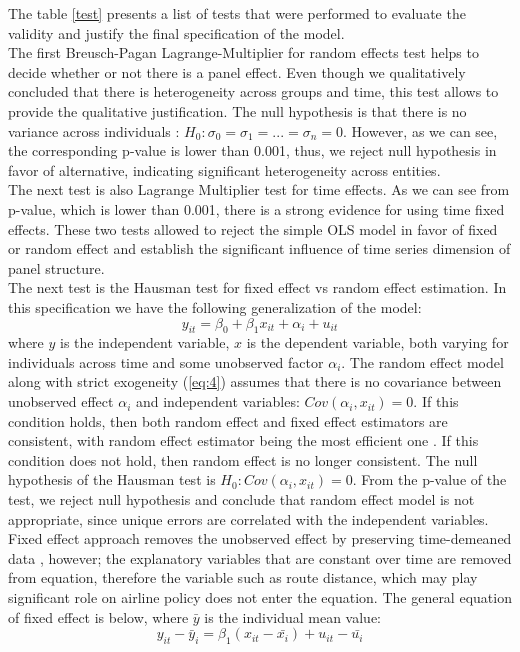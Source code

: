 \documentclass[titlepage, 11pt]{article}
\begin{document}
The table \ref{test} presents a list of tests that were performed to evaluate the validity and justify the final specification of the model. \\ 
\tab The first Breusch-Pagan Lagrange-Multiplier for random effects test helps to decide whether or not there is a panel effect. Even though we qualitatively concluded that there is heterogeneity across groups and time, this test allows to provide the qualitative justification. The null hypothesis is that there is no variance across individuals \cite{book}:
$H_0: \sigma_0=\sigma_1=...=\sigma_n=0$. However, as we can see, the corresponding p-value is lower than 0.001, thus, we reject null hypothesis in favor of alternative, indicating significant heterogeneity across entities.  \\ 
\tab The next test is also Lagrange Multiplier test for time effects. As we can see from p-value, which is lower than 0.001, there is a strong evidence for using time fixed effects. These two tests allowed to reject the simple OLS model in favor of fixed or random effect and establish the significant influence of time series dimension of panel structure.    \\ 
\tab The next test is the Hausman test for fixed effect vs random effect estimation. 
In this specification we have the following generalization of the model: 
\begin{equation} \label{eq:6}
y_{it} = \beta_0 + \beta_1x_{it} + \alpha_i + u_{it}
\end{equation}
where $y$ is the independent variable, $x$ is the dependent variable, both varying for individuals across time and some unobserved factor $\alpha_i$. The random effect model along with strict exogeneity (\ref{eq:4}) assumes that there is no covariance between unobserved effect $\alpha_i$ and independent variables: $Cov(\alpha_i, x_{it})=0$. If this condition holds, then both random effect and fixed effect estimators are consistent, with random effect estimator being the most efficient one \cite{book}. If this condition does not hold, then random effect is no longer consistent. The null hypothesis of the Hausman test is $H_0:Cov(\alpha_i, x_{it})=0$. From the p-value of the test, we reject null hypothesis and conclude that random effect model is not appropriate, since unique errors are correlated with the independent variables. \\ 

\tab Fixed effect approach removes the unobserved effect by preserving time-demeaned data \cite{book}, however; the explanatory variables that are constant over time are removed from equation, therefore the variable such as route distance, which may play significant role on airline policy does not enter the equation. The general equation of fixed effect is below, where $\bar{y}$ is the individual mean value: 
\begin{equation}
y_{it}-\bar{y}_i = \beta_1(x_{it}-\bar{x_i}) +u_{it}-\bar{u_i}
\end{equation}
\end{document}

